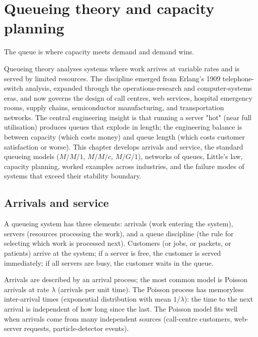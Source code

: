 \chapter{Queueing theory and capacity planning}
\label{vol09:ch08}

\epigraph{The queue is where capacity meets demand and demand wins.}{}


\noindent
Queueing theory analyses systems where work arrives at variable rates and is served by limited resources. The discipline emerged from Erlang's 1909 telephone-switch analysis, expanded through the operations-research and computer-systems eras, and now governs the design of call centres, web services, hospital emergency rooms, supply chains, semiconductor manufacturing, and transportation networks. The central engineering insight is that running a server "hot" (near full utilisation) produces queues that explode in length; the engineering balance is between capacity (which costs money) and queue length (which costs customer satisfaction or worse). This chapter develops arrivals and service, the standard queueing models ($M/M/1$, $M/M/c$, $M/G/1$), networks of queues, Little's law, capacity planning, worked examples across industries, and the failure modes of systems that exceed their stability boundary.

\section{Arrivals and service}

A queueing system has three elements: arrivals (work entering the system), servers (resources processing the work), and a queue discipline (the rule for selecting which work is processed next). Customers (or jobs, or packets, or patients) arrive at the system; if a server is free, the customer is served immediately; if all servers are busy, the customer waits in the queue.

Arrivals are described by an arrival process; the most common model is Poisson arrivals at rate $\lambda$ (arrivals per unit time). The Poisson process has memoryless inter-arrival times (exponential distribution with mean $1/\lambda$): the time to the next arrival is independent of how long since the last. The Poisson model fits well when arrivals come from many independent sources (call-centre customers, web-server requests, particle-detector events).

